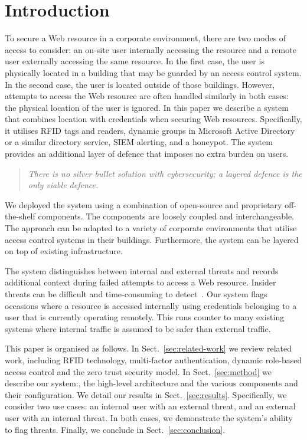 \section{Introduction}\label{sec:introduction}

To secure a Web resource in a corporate environment, there are two
modes of access to consider: an on-site user internally accessing the
resource and a remote user externally accessing the same resource.  In
the first case, the user is physically located in a building that may
be guarded by an access control system.  In the second case, the user
is located outside of those buildings.  However, attempts to access
the Web resource are often handled similarly in both cases: the
physical location of the user is ignored.  In this paper we describe a
system that combines location with credentials when securing Web
resources.  Specifically, it utilises RFID tags and readers, dynamic
groups in Microsoft Active Directory or a similar directory service,
SIEM alerting, and a honeypot.  The system provides an additional
layer of defence that imposes no extra burden on users.

\begin{quote}
  \em{There is no silver bullet solution with cybersecurity; a layered
    defence is the only viable defence.}

\end{quote}

We deployed the system using a combination of open-source and
proprietary off-the-shelf components.  The components are loosely
coupled and interchangeable.  The approach can be adapted to a variety
of corporate environments that utilise access control systems in their
buildings.  Furthermore, the system can be layered on top of existing
infrastructure.

The system distinguishes between internal and external threats and
records additional context during failed attempts to access a Web
resource.  Insider threats can be difficult and time-consuming to
detect~\cite{liu-et-al-18}.  Our system flags occasions where a
resource is accessed internally using credentials belonging to a user
that is currently operating remotely.  This runs counter to many
existing systems where internal traffic is assumed to be safer than
external traffic.

This paper is organised as follows.  In Sect.~\ref{sec:related-work}
we review related work, including RFID technology, multi-factor
authentication, dynamic role-based access control and the zero trust
security model.  In Sect.~\ref{sec:method} we describe our system:,
the high-level architecture and the various components and their
configuration.  We detail our results in Sect.~\ref{sec:results}.
Specifically, we consider two use cases: an internal user with an
external threat, and an external user with an internal threat.  In
both cases, we demonstrate the system's ability to flag threats.
Finally, we conclude in Sect.~\ref{sec:conclusion}.
